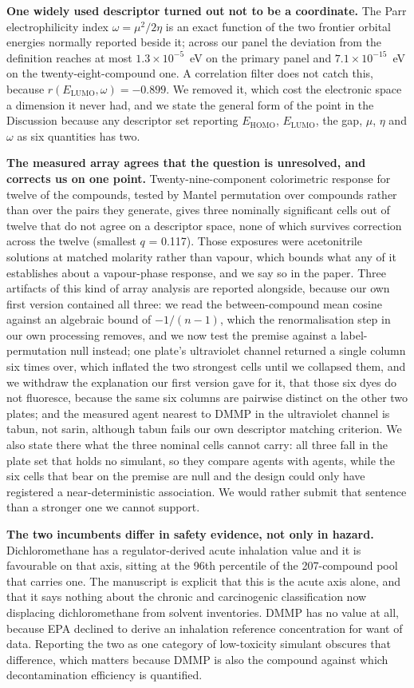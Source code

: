 \documentclass[11pt,a4paper]{article}
\begin{document}
\textbf{One widely used descriptor turned out not to be a coordinate.} The Parr
electrophilicity index $\omega = \mu^{2}/2\eta$ is an exact function of the two
frontier orbital energies normally reported beside it; across our panel the
deviation from the definition reaches at most $1.3\times10^{-5}$~eV on the
primary panel and $7.1\times10^{-15}$~eV on the twenty-eight-compound one. A correlation
filter does not catch this, because $r(E_\mathrm{LUMO}, \omega) = -0.899$. We
removed it, which cost the electronic space a dimension it never had, and we
state the general form of the point in the Discussion because any descriptor set
reporting $E_\mathrm{HOMO}$, $E_\mathrm{LUMO}$, the gap, $\mu$, $\eta$ and
$\omega$ as six quantities has two.

\textbf{The measured array agrees that the question is unresolved, and corrects
us on one point.} Twenty-nine-component colorimetric response for twelve of the
compounds, tested by Mantel permutation over compounds rather than over the
pairs they generate, gives three nominally significant cells out of twelve that
do not agree on a descriptor space, none of which survives correction across
the twelve (smallest $q$ = 0.117). Those exposures were acetonitrile solutions
at matched molarity rather than vapour, which bounds what any of it establishes
about a vapour-phase response, and we say so in the paper. Three artifacts of this kind of array analysis
are reported alongside, because our own first version contained all three:
we read the between-compound mean cosine against an algebraic bound of
$-1/(n-1)$, which the renormalisation step in our own processing removes, and
we now test the premise against a label-permutation null instead; one plate's ultraviolet channel returned a single
column six times over, which inflated the two strongest cells until we
collapsed them, and we withdraw the explanation our first version gave for it,
that those six dyes do not fluoresce, because the same six columns are
pairwise distinct on the other two plates; and the
measured agent nearest to DMMP in the ultraviolet channel is tabun, not sarin,
although tabun fails our own descriptor matching criterion. We also state
there what the three nominal cells cannot carry: all three fall in the plate
set that holds no simulant, so they compare agents with agents, while the six
cells that bear on the premise are null and the design could only have
registered a near-deterministic association. We would rather submit that
sentence than a stronger one we cannot support.

\textbf{The two incumbents differ in safety evidence, not only in hazard.}
Dichloromethane has a regulator-derived acute inhalation value and it is
favourable on that axis, sitting at the 96th percentile of the 207-compound pool
that carries one. The manuscript is explicit that this is the acute axis alone,
and that it says nothing about the chronic and carcinogenic classification
now displacing dichloromethane from solvent inventories. DMMP has no value
at all, because EPA declined to derive an inhalation reference concentration for
want of data. Reporting the two as one category of low-toxicity simulant
obscures that difference, which matters because DMMP is also the compound against
which decontamination efficiency is quantified.
\end{document}

